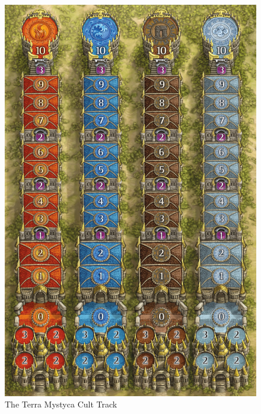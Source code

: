 \documentclass[10pt,twocolumn,letterpaper]{article}
\begin{document}
\begin{figure}[h!]
    \centering
    \includegraphics[scale=0.6]{../figures/terra-mystica-cult}
    \caption{The Terra Mystyca Cult Track}
    \label{fig:TM_Cult_Track}
\end{figure}

{\small


}
\end{document}
